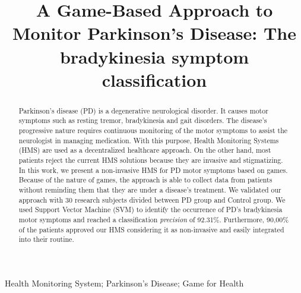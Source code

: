 \documentclass[10pt, conference, compsocconf]{IEEEtran}
\begin{document}
%
\title{A Game-Based Approach to Monitor Parkinson's Disease: The bradykinesia symptom classification}


\author{
}

\maketitle


\begin{abstract}
Parkinson's disease (PD) is a degenerative neurological disorder. It causes motor symptoms such as resting tremor, bradykinesia and gait disorders. The disease's progressive nature requires continuous monitoring of the motor symptoms to assist the neurologist in managing medication. With this purpose, Health Monitoring Systems (HMS) are used as a decentralized healthcare approach. On the other hand, most patients reject the current HMS solutions because they are invasive and stigmatizing. In this work, we present a non-invasive HMS for PD motor symptoms based on games. Because of the nature of games, the approach is able to collect data from patients without reminding them that they are under a disease's treatment. We validated our approach with 30 research subjects divided between PD group and Control group. We used Support Vector Machine (SVM) to identify the occurrence of PD's bradykinesia motor symptoms and reached a classification \textit{precision} of 92.31\%. Furthermore, 90,00\% of the patients approved our HMS considering it as non-invasive and easily integrated into their routine.
\end{abstract}

\begin{IEEEkeywords}
Health Monitoring System; Parkinson's Disease; Game for Health
\end{IEEEkeywords}


\IEEEpeerreviewmaketitle
\end{document}
